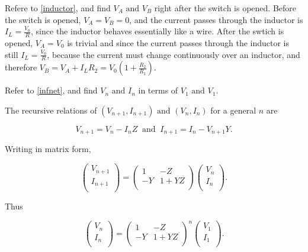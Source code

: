 \documentclass[english,a4paper,12pt]{report}
\begin{document}
{Refere to \cref{inductor}, and find \(V_{A} \text { and } V_{B}  \) right after the switch is opened.}
{Before the switch is opened, \(V_{A} = V_{B} = 0\), and the current passes through the inductor is \(I_{L} = \frac{V_0 }{R}  \), since the inductor behaves essentially like a wire. After the swtich is opened, \(V_{A} = V_{0}  \) is trivial and since the current passes through the inductor is still \(I_{L} = \frac{V_0 }{R}  \), because the current must change continuously over an inductor, and therefore \(V_{B} = V_{A} + I_{L}R_2 = V_{0} \left( 1+ \frac{R_2 }{R_1 }  \right)   \).   } 


{Refer to \cref{infnet}, and find \(V_{n} \text { and } I_{n}  \) in terms of \(V_1 \text { and } V_1 \).}
{The recursive relations of \((V_{n+1}, I_{n+1}) \text { and } (V_{n}, I_{n})\) for a general \(n\) are

\begin{equation}
    V_{n+1} = V_{n} - I_{n}Z ~\text { and }~ I_{n+1} = I_{n} - V_{n+1}Y.      
\end{equation}

Writing in matrix form,

\begin{equation}
    \begin{pmatrix}
         V_{n+1}  \\
         I_{n+1}  \\
    \end{pmatrix} = \begin{pmatrix}
        1 & -Z   \\
        -Y & 1+YZ  \\
    \end{pmatrix} \begin{pmatrix}
         V_{n}  \\
         I_{n}  \\
    \end{pmatrix}.
\end{equation}

Thus 

\begin{equation}
    \begin{pmatrix}
         V_{n}  \\
         I_{n}  \\
    \end{pmatrix} = \begin{pmatrix}
        1 & -Z  \\
        -Y & 1+YZ  \\
    \end{pmatrix}^{n} \begin{pmatrix}
        V_{1}  \\
        I_{1}  \\
   \end{pmatrix}.
\end{equation}



} 
\end{document}
